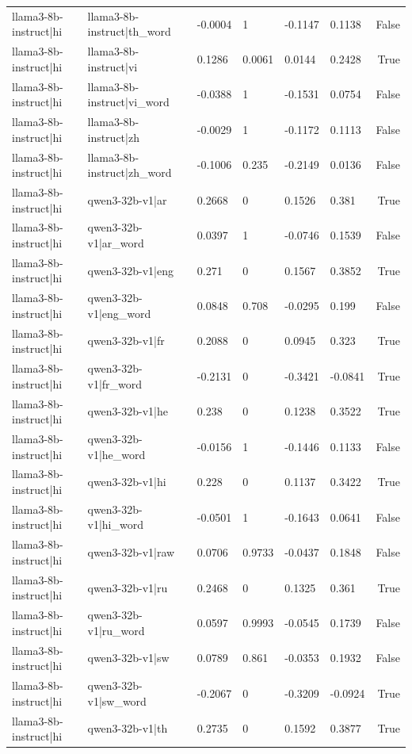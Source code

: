 \begin{table}
\begin{tabular}{llllllr}
llama3-8b-instruct|hi & llama3-8b-instruct|th_word & -0.0004 & 1 & -0.1147 & 0.1138 & False \\
llama3-8b-instruct|hi & llama3-8b-instruct|vi & 0.1286 & 0.0061 & 0.0144 & 0.2428 & True \\
llama3-8b-instruct|hi & llama3-8b-instruct|vi_word & -0.0388 & 1 & -0.1531 & 0.0754 & False \\
llama3-8b-instruct|hi & llama3-8b-instruct|zh & -0.0029 & 1 & -0.1172 & 0.1113 & False \\
llama3-8b-instruct|hi & llama3-8b-instruct|zh_word & -0.1006 & 0.235 & -0.2149 & 0.0136 & False \\
llama3-8b-instruct|hi & qwen3-32b-v1|ar & 0.2668 & 0 & 0.1526 & 0.381 & True \\
llama3-8b-instruct|hi & qwen3-32b-v1|ar_word & 0.0397 & 1 & -0.0746 & 0.1539 & False \\
llama3-8b-instruct|hi & qwen3-32b-v1|eng & 0.271 & 0 & 0.1567 & 0.3852 & True \\
llama3-8b-instruct|hi & qwen3-32b-v1|eng_word & 0.0848 & 0.708 & -0.0295 & 0.199 & False \\
llama3-8b-instruct|hi & qwen3-32b-v1|fr & 0.2088 & 0 & 0.0945 & 0.323 & True \\
llama3-8b-instruct|hi & qwen3-32b-v1|fr_word & -0.2131 & 0 & -0.3421 & -0.0841 & True \\
llama3-8b-instruct|hi & qwen3-32b-v1|he & 0.238 & 0 & 0.1238 & 0.3522 & True \\
llama3-8b-instruct|hi & qwen3-32b-v1|he_word & -0.0156 & 1 & -0.1446 & 0.1133 & False \\
llama3-8b-instruct|hi & qwen3-32b-v1|hi & 0.228 & 0 & 0.1137 & 0.3422 & True \\
llama3-8b-instruct|hi & qwen3-32b-v1|hi_word & -0.0501 & 1 & -0.1643 & 0.0641 & False \\
llama3-8b-instruct|hi & qwen3-32b-v1|raw & 0.0706 & 0.9733 & -0.0437 & 0.1848 & False \\
llama3-8b-instruct|hi & qwen3-32b-v1|ru & 0.2468 & 0 & 0.1325 & 0.361 & True \\
llama3-8b-instruct|hi & qwen3-32b-v1|ru_word & 0.0597 & 0.9993 & -0.0545 & 0.1739 & False \\
llama3-8b-instruct|hi & qwen3-32b-v1|sw & 0.0789 & 0.861 & -0.0353 & 0.1932 & False \\
llama3-8b-instruct|hi & qwen3-32b-v1|sw_word & -0.2067 & 0 & -0.3209 & -0.0924 & True \\
llama3-8b-instruct|hi & qwen3-32b-v1|th & 0.2735 & 0 & 0.1592 & 0.3877 & True \\

\end{tabular}
\end{table}
